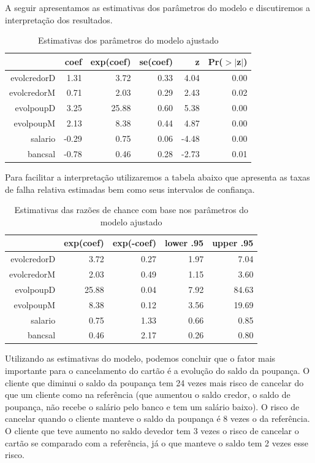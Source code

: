 \documentclass{article}\usepackage[]{graphicx}\usepackage[]{color}
\begin{document}
A seguir apresentamos as estimativas dos parâmetros do modelo e discutiremos a interpretação dos resultados.

\begin{table}[ht]
\centering
\begin{tabular}{rrrrrr}
  \hline
 & coef & exp(coef) & se(coef) & z & Pr($>$$|$z$|$) \\ 
  \hline
evolcredorD & 1.31 & 3.72 & 0.33 & 4.04 & 0.00 \\ 
  evolcredorM & 0.71 & 2.03 & 0.29 & 2.43 & 0.02 \\ 
  evolpoupD & 3.25 & 25.88 & 0.60 & 5.38 & 0.00 \\ 
  evolpoupM & 2.13 & 8.38 & 0.44 & 4.87 & 0.00 \\ 
  salario & -0.29 & 0.75 & 0.06 & -4.48 & 0.00 \\ 
  bancsal & -0.78 & 0.46 & 0.28 & -2.73 & 0.01 \\ 
   \hline
\end{tabular}
\caption{Estimativas dos parâmetros do modelo ajustado} 
\end{table}


Para facilitar a interpretação utilizaremos a tabela abaixo que apresenta as taxas de falha relativa estimadas bem como seus intervalos de confiança.

\begin{table}[ht]
\centering
\begin{tabular}{rrrrr}
  \hline
 & exp(coef) & exp(-coef) & lower .95 & upper .95 \\ 
  \hline
evolcredorD & 3.72 & 0.27 & 1.97 & 7.04 \\ 
  evolcredorM & 2.03 & 0.49 & 1.15 & 3.60 \\ 
  evolpoupD & 25.88 & 0.04 & 7.92 & 84.63 \\ 
  evolpoupM & 8.38 & 0.12 & 3.56 & 19.69 \\ 
  salario & 0.75 & 1.33 & 0.66 & 0.85 \\ 
  bancsal & 0.46 & 2.17 & 0.26 & 0.80 \\ 
   \hline
\end{tabular}
\caption{Estimativas das razões de chance com base nos parâmetros do modelo ajustado} 
\end{table}


Utilizando as estimativas do modelo, podemos concluir que o fator mais importante para o cancelamento do cartão é a evolução do saldo da poupança. O cliente que diminui o saldo da poupança tem 24 vezes mais risco de cancelar do que um cliente como na referência (que aumentou o saldo credor, o saldo de poupança, não recebe o salário pelo banco e tem um salário baixo). O risco de cancelar quando o cliente manteve o saldo da poupança é 8 vezes o da referência.
O cliente que teve aumento no saldo devedor tem 3 vezes o risco de cancelar o cartão se comparado com a referência, já o que manteve o saldo tem 2 vezes esse risco.
\end{document}
